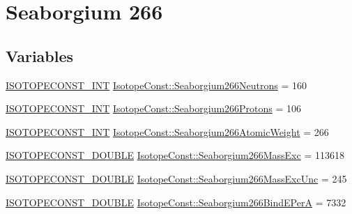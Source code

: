 \hypertarget{group___isotope_const-_seaborgium-_sg266}{}\section{Seaborgium 266}
\label{group___isotope_const-_seaborgium-_sg266}
\subsection*{Variables}
\begin{DoxyCompactItemize}
\item 
\mbox{\hyperlink{group___isotope_const-_macros_ga5f18360b3e99483a35c32d789e62621c}{I\+S\+O\+T\+O\+P\+E\+C\+O\+N\+S\+T\+\_\+\+I\+NT}} \mbox{\hyperlink{group___isotope_const-_seaborgium-_sg266_ga5aaabe4689a54f9d6146a2bf29766bae}{Isotope\+Const\+::\+Seaborgium266\+Neutrons}} = 160
\item 
\mbox{\hyperlink{group___isotope_const-_macros_ga5f18360b3e99483a35c32d789e62621c}{I\+S\+O\+T\+O\+P\+E\+C\+O\+N\+S\+T\+\_\+\+I\+NT}} \mbox{\hyperlink{group___isotope_const-_seaborgium-_sg266_ga7fbf415fb09c5cd55a3f0a540a2545fb}{Isotope\+Const\+::\+Seaborgium266\+Protons}} = 106
\item 
\mbox{\hyperlink{group___isotope_const-_macros_ga5f18360b3e99483a35c32d789e62621c}{I\+S\+O\+T\+O\+P\+E\+C\+O\+N\+S\+T\+\_\+\+I\+NT}} \mbox{\hyperlink{group___isotope_const-_seaborgium-_sg266_ga9cb291a3b7be3eb2883cb49d7f8509eb}{Isotope\+Const\+::\+Seaborgium266\+Atomic\+Weight}} = 266
\item 
\mbox{\hyperlink{group___isotope_const-_macros_ga8f45a7272ce02c0b4c65c44636ed719a}{I\+S\+O\+T\+O\+P\+E\+C\+O\+N\+S\+T\+\_\+\+D\+O\+U\+B\+LE}} \mbox{\hyperlink{group___isotope_const-_seaborgium-_sg266_ga10264974c8c24c44b7fa73be942cb3df}{Isotope\+Const\+::\+Seaborgium266\+Mass\+Exc}} = 113618
\item 
\mbox{\hyperlink{group___isotope_const-_macros_ga8f45a7272ce02c0b4c65c44636ed719a}{I\+S\+O\+T\+O\+P\+E\+C\+O\+N\+S\+T\+\_\+\+D\+O\+U\+B\+LE}} \mbox{\hyperlink{group___isotope_const-_seaborgium-_sg266_gabb59cead9ee36365574c8fd487b08e58}{Isotope\+Const\+::\+Seaborgium266\+Mass\+Exc\+Unc}} = 245
\item 
\mbox{\hyperlink{group___isotope_const-_macros_ga8f45a7272ce02c0b4c65c44636ed719a}{I\+S\+O\+T\+O\+P\+E\+C\+O\+N\+S\+T\+\_\+\+D\+O\+U\+B\+LE}} \mbox{\hyperlink{group___isotope_const-_seaborgium-_sg266_ga93a57a881a17fb36afb5b2f66c718cbc}{Isotope\+Const\+::\+Seaborgium266\+Bind\+E\+PerA}} = 7332
\item 

\end{DoxyCompactItemize}
